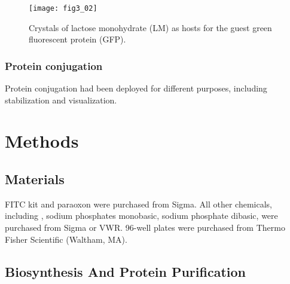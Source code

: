 \begin{refsection}
\begin{figure}[h!] \centering \texttt{[image: fig3\_02]} 
    \caption[Crystals of lactose monohydrate (LM) as hosts for the guest green
    fluorescent protein (GFP)]{Crystals of lactose monohydrate (LM) as hosts
        for the guest green fluorescent protein (GFP)\cite{Wang2001a}.}
    \label{fig:lm-intro}
\end{figure}

\subsubsection{Protein conjugation}

Protein conjugation had been deployed for different purposes, including
stabilization and visualization. 

\section{Methods}

\subsection{Materials}

FITC kit and paraoxon were purchased from Sigma. All other chemicals,
including , sodium phosphates monobasic, sodium phosphate dibasic,
were purchased from Sigma or VWR. 96-well plates were purchased from Thermo
Fisher Scientific (Waltham, MA).

\subsection{Biosynthesis And Protein Purification}
\label{sec:pte-chap3}


\end{refsection}
